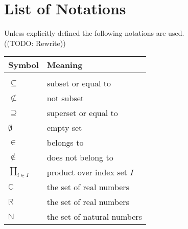 \chapter*{List of Notations}
Unless explicitly defined the following notations are used.\\
((TODO: Rewrite))
\begin{tabular}{p{2cm}p{5cm}}
	\textbf{Symbol} & \textbf{Meaning}\\
	\hline
	& \\
	$\subseteq$ & subset or equal to \\%
	$\not\subset$ & not subset\\%
	$\supseteq$ & superset or equal to \\
	$\emptyset$ & empty set\\%
	$\in$ & belongs to\\%
	$\not \in $ & does not belong to \\
	$\displaystyle\prod_{i \in I}$ & product over index set $I$ \\
	$\mathbb{C}$ & the set of real numbers\\%
	$\mathbb{R}$ & the set of real numbers\\%
	$\mathbb{N}$ & the set of natural numbers\\%
\end{tabular}
